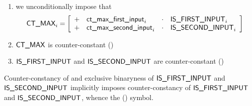 \begin{enumerate}[resume]
    \item we unconditionally impose that
        \[
            \begin{array}{l}
                \textsf{CT\_MAX} _{i} =
                \left[ \begin{array}{clcl}
                    + & \textsf{ct\_max\_first\_input}_{i} & \cdot & \textsf{IS\_FIRST\_INPUT}_{i} \\
                    + & \textsf{ct\_max\_second\_input}_{i}& \cdot & \textsf{IS\_SECOND\_INPUT}_{i} \\
                \end{array} \right] \\
            \end{array}
        \]
    \item $\textsf{CT\_MAX}$ is counter-constant \quad (\trash)
    \item $\textsf{IS\_FIRST\_INPUT}$ and $\textsf{IS\_SECOND\_INPUT}$ are counter-constant \quad (\trash)
\end{enumerate}
\saNote{} Counter-constancy of \maxCt{} and exclusive binaryness of $\textsf{IS\_FIRST\_INPUT}$ and $\textsf{IS\_SECOND\_INPUT}$ implicitly imposes counter-constancy of $\textsf{IS\_FIRST\_INPUT}$ and $\textsf{IS\_SECOND\_INPUT}$,
whence the (\trash) symbol.


